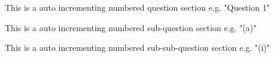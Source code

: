 \documentclass{utad_msc}
\begin{document}


\tableofcontents
\newpage

\question

This is a auto incrementing numbered question section e.g. "Question 1" 

This is a auto incrementing numbered sub-question section e.g. "(a)" 

This is a auto incrementing numbered sub-sub-question section e.g. "(i)" 
\end{document}
